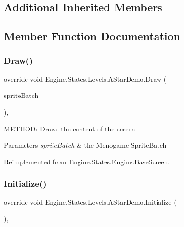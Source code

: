\subsection*{Additional Inherited Members}


\subsection{Member Function Documentation}
\mbox{\label{a00562_ad5b2061652982cb94e7c01c39f59a984}} 
\subsubsection{\texorpdfstring{Draw()}{Draw()}}
{\footnotesize\ttfamily override void Engine.\+States.\+Levels.\+A\+Star\+Demo.\+Draw (\begin{DoxyParamCaption}\item[{Sprite\+Batch}]{sprite\+Batch }\end{DoxyParamCaption})\hspace{0.3cm}{\ttfamily [inline]}, {\ttfamily [virtual]}}



M\+E\+T\+H\+OD\+: Draws the content of the screen 


\begin{DoxyParams}{Parameters}
{\em sprite\+Batch} & the Monogame Sprite\+Batch\\
\hline
\end{DoxyParams}


Reimplemented from \hyperlink{a00550_a200c31954effe5fc060118607155fb16}{Engine.\+States.\+Engine.\+Base\+Screen}.

\mbox{\label{a00562_a143dfe5c81e8cd31fe6439aad1de00c6}} 
\subsubsection{\texorpdfstring{Initialize()}{Initialize()}}
{\footnotesize\ttfamily override void Engine.\+States.\+Levels.\+A\+Star\+Demo.\+Initialize (\begin{DoxyParamCaption}{ }\end{DoxyParamCaption})\hspace{0.3cm}{\ttfamily [inline]}, {\ttfamily [virtual]}}



